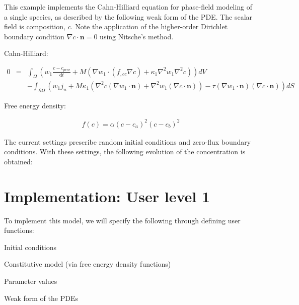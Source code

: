 

This example implements the Cahn-\/\-Hilliard equation for phase-\/field modeling of a single species, as described by the following weak form of the P\-D\-E. The scalar field is composition, $c$. Note the application of the higher-\/order Dirichlet boundary condition $\nabla c\cdot\boldsymbol{n}=0$ using Nitsche's method.

Cahn-\/\-Hilliard\-:

\begin{eqnarray*} 0 &=& \int_\Omega \left(w_1\frac{c - c_{prev}}{\mathrm{d}t} + M\left(\nabla w_1\cdot(f_{,cc}\nabla c) + \kappa_1\nabla^2 w_1\nabla^2 c\right)\right) dV\\ &\phantom{=}& - \int_{\partial\Omega} \left(w_1j_n + M\kappa_1\left(\nabla^2c(\nabla w_1\cdot\boldsymbol{n}) + \nabla^2w_1(\nabla c\cdot\boldsymbol{n})\right) - \tau(\nabla w_1\cdot\boldsymbol{n})(\nabla c\cdot\boldsymbol{n})\right) dS \end{eqnarray*}

Free energy density\-:

\begin{eqnarray*} f(c) = \alpha(c - c_a)^2(c - c_b)^2 \end{eqnarray*}

The current settings prescribe random initial conditions and zero-\/flux boundary conditions. With these settings, the following evolution of the concentration is obtained\-:

 

\section*{Implementation\-: User level 1 }

To implement this model, we will specify the following through defining user functions\-: \par

\begin{DoxyItemize}
\item Initial conditions \par

\item Constitutive model (via free energy density functions) \par

\item Parameter values \par

\item Weak form of the P\-D\-Es \par

\end{DoxyItemize}

